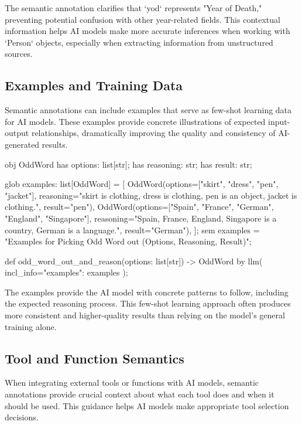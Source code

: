 The semantic annotation clarifies that `yod` represents "Year of Death," preventing potential confusion with other year-related fields. This contextual information helps AI models make more accurate inferences when working with `Person` objects, especially when extracting information from unstructured sources.

\subsection{Examples and Training Data}

Semantic annotations can include examples that serve as few-shot learning data for AI models. These examples provide concrete illustrations of expected input-output relationships, dramatically improving the quality and consistency of AI-generated results.

\begin{jacblock}
obj OddWord {
    has options: list[str];
    has reasoning: str;
    has result: str;
}

glob examples: list[OddWord] = [
    OddWord(options=["skirt", "dress", "pen", "jacket"],
            reasoning="skirt is clothing, dress is clothing, pen is an object, jacket is clothing.",
            result="pen"),
    OddWord(options=["Spain", "France", "German", "England", "Singapore"],
            reasoning="Spain, France, England, Singapore is a country, German is a language.",
            result="German"),
];
sem examples = "Examples for Picking Odd Word out (Options, Reasoning, Result)";

def odd_word_out_and_reason(options: list[str]) -> OddWord by llm(
    incl_info={"examples": examples}
);
\end{jacblock}

The examples provide the AI model with concrete patterns to follow, including the expected reasoning process. This few-shot learning approach often produces more consistent and higher-quality results than relying on the model's general training alone.

\subsection{Tool and Function Semantics}

When integrating external tools or functions with AI models, semantic annotations provide crucial context about what each tool does and when it should be used. This guidance helps AI models make appropriate tool selection decisions.

